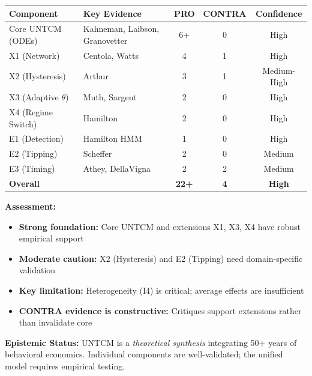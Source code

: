 \begin{tcolorbox}[colback=yellow!5!white, colframe=yellow!75!black,
    title=\textbf{UNTCM Evidence Summary: Confidence Assessment}]

\begin{center}
\renewcommand{\arraystretch}{1.3}
\begin{tabular}{@{}llccc@{}}
\toprule
\textbf{Component} & \textbf{Key Evidence} & \textbf{PRO} & \textbf{CONTRA} & \textbf{Confidence} \\
\midrule
Core UNTCM (ODEs) & Kahneman, Laibson, Granovetter & 6+ & 0 & High \\
X1 (Network) & Centola, Watts & 4 & 1 & High \\
X2 (Hysteresis) & Arthur & 3 & 1 & Medium-High \\
X3 (Adaptive $\theta$) & Muth, Sargent & 2 & 0 & High \\
X4 (Regime Switch) & Hamilton & 2 & 0 & High \\
E1 (Detection) & Hamilton HMM & 1 & 0 & High \\
E2 (Tipping) & Scheffer & 2 & 0 & Medium \\
E3 (Timing) & Athey, DellaVigna & 2 & 2 & Medium \\
\midrule
\textbf{Overall} & & \textbf{22+} & \textbf{4} & \textbf{High} \\
\bottomrule
\end{tabular}
\end{center}

\textbf{Assessment:}
\begin{itemize}[nosep]
\item \textbf{Strong foundation:} Core UNTCM and extensions X1, X3, X4 have robust empirical support
\item \textbf{Moderate caution:} X2 (Hysteresis) and E2 (Tipping) need domain-specific validation
\item \textbf{Key limitation:} Heterogeneity (I4) is critical; average effects are insufficient
\item \textbf{CONTRA evidence is constructive:} Critiques support extensions rather than invalidate core
\end{itemize}

\textbf{Epistemic Status:} UNTCM is a \emph{theoretical synthesis} integrating 50+ years of behavioral economics. Individual components are well-validated; the unified model requires empirical testing.

\end{tcolorbox}

